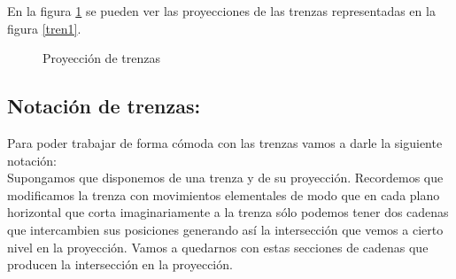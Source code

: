 En la figura \ref{tren2} se pueden ver las proyecciones de las trenzas representadas en la figura \ref{tren1}.\\
\begin{figure}[h!]
	\centering
	\space
	\caption{Proyección de trenzas}
	\label{tren2} 
\end{figure} 

\newpage
\begin{center}
	\subsection{Notación de trenzas:}
\end{center}
Para poder trabajar de forma cómoda con las trenzas vamos a darle la siguiente notación:\\

Supongamos que disponemos de una trenza y de su proyección. Recordemos que modificamos la trenza con movimientos elementales de modo que en cada plano horizontal que corta imaginariamente a la trenza sólo podemos tener dos cadenas que intercambien sus posiciones generando así la intersección que vemos a cierto nivel en la proyección. Vamos a quedarnos con estas secciones de cadenas que producen la intersección en la proyección.\\  

